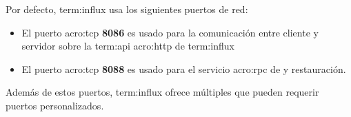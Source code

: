 Por defecto, \gls{term:influx} usa los siguientes puertos de red:

\begin{itemize}

  \item
  El puerto \gls{acro:tcp} \textbf{8086} es usado para la comunicación entre cliente y
  servidor sobre la \gls{term:api} \gls{acro:http} de \gls{term:influx}

  \item
    El puerto \gls{acro:tcp} \textbf{8088} es usado para el servicio \gls{acro:rpc} de  y
  restauración.

\end{itemize}

Además de estos puertos, \gls{term:influx} ofrece múltiples  que
pueden requerir puertos personalizados.
